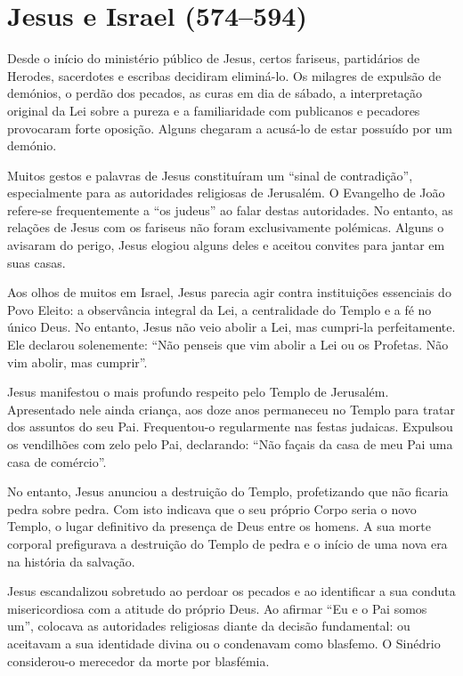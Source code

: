 \section{Jesus e Israel (574--594)}

Desde o início do ministério público de Jesus, certos fariseus, partidários de Herodes, sacerdotes e escribas decidiram eliminá-lo. Os milagres de expulsão de demónios, o perdão dos pecados, as curas em dia de sábado, a interpretação original da Lei sobre a pureza e a familiaridade com publicanos e pecadores provocaram forte oposição. Alguns chegaram a acusá-lo de estar possuído por um demónio.

Muitos gestos e palavras de Jesus constituíram um ``sinal de contradição'', especialmente para as autoridades religiosas de Jerusalém. O Evangelho de João refere-se frequentemente a ``os judeus'' ao falar destas autoridades. No entanto, as relações de Jesus com os fariseus não foram exclusivamente polémicas. Alguns o avisaram do perigo, Jesus elogiou alguns deles e aceitou convites para jantar em suas casas.

Aos olhos de muitos em Israel, Jesus parecia agir contra instituições essenciais do Povo Eleito: a observância integral da Lei, a centralidade do Templo e a fé no único Deus. No entanto, Jesus não veio abolir a Lei, mas cumpri-la perfeitamente. Ele declarou solenemente: ``Não penseis que vim abolir a Lei ou os Profetas. Não vim abolir, mas cumprir''.

Jesus manifestou o mais profundo respeito pelo Templo de Jerusalém. Apresentado nele ainda criança, aos doze anos permaneceu no Templo para tratar dos assuntos do seu Pai. Frequentou-o regularmente nas festas judaicas. Expulsou os vendilhões com zelo pelo Pai, declarando: ``Não façais da casa de meu Pai uma casa de comércio''. 

No entanto, Jesus anunciou a destruição do Templo, profetizando que não ficaria pedra sobre pedra. Com isto indicava que o seu próprio Corpo seria o novo Templo, o lugar definitivo da presença de Deus entre os homens. A sua morte corporal prefigurava a destruição do Templo de pedra e o início de uma nova era na história da salvação.

Jesus escandalizou sobretudo ao perdoar os pecados e ao identificar a sua conduta misericordiosa com a atitude do próprio Deus. Ao afirmar ``Eu e o Pai somos um'', colocava as autoridades religiosas diante da decisão fundamental: ou aceitavam a sua identidade divina ou o condenavam como blasfemo. O Sinédrio considerou-o merecedor da morte por blasfémia.

